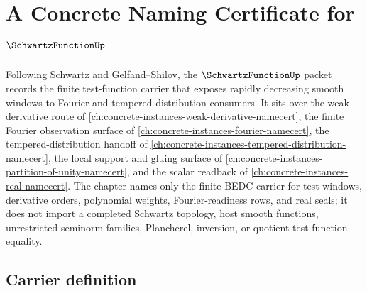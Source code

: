 \chapter{A Concrete Naming Certificate for $\SchwartzFunctionUp$}
\label{ch:concrete-instances-schwartz-function-namecert}

Following Schwartz and Gelfand--Shilov, the $\SchwartzFunctionUp$ packet records the finite test-function carrier that exposes rapidly decreasing smooth windows to Fourier and tempered-distribution consumers. It sits over the weak-derivative route of \autoref{ch:concrete-instances-weak-derivative-namecert}, the finite Fourier observation surface of \autoref{ch:concrete-instances-fourier-namecert}, the tempered-distribution handoff of \autoref{ch:concrete-instances-tempered-distribution-namecert}, the local support and gluing surface of \autoref{ch:concrete-instances-partition-of-unity-namecert}, and the scalar readback of \autoref{ch:concrete-instances-real-namecert}. The chapter names only the finite BEDC carrier for test windows, derivative orders, polynomial weights, Fourier-readiness rows, and real seals; it does not import a completed Schwartz topology, host smooth functions, unrestricted seminorm families, Plancherel, inversion, or quotient test-function equality.

\section{Carrier definition}
\label{sec:schwartz-function-carrier}

